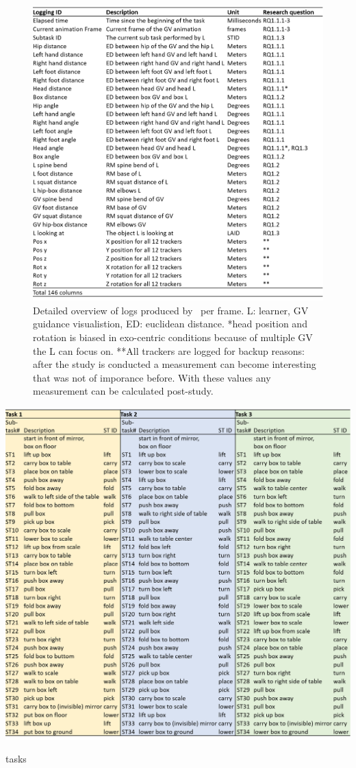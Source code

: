 \begin{figure}[htb]
	\centering
	\includegraphics[width=\textwidth]{figures/logging_detail.png}
	\caption[logging detail]{Detailed overview of logs produced by \exgo\ per frame. L: learner, GV guidance visualistion, ED: euclidean distance. *head position and rotation is biased in exo-centric conditions because of multiple GV the L can focus on. **All trackers are logged for backup reasons: after the study is conducted a measurement can become interesting that was not of imporance before. With these values any measurement can be calculated post-study.}
	\label{fig:logging_detail}
\end{figure}

\begin{table}[htb]
	\centering
	\includegraphics[width=\textwidth]{figures/tasks.png}
	\caption[Description of tasks]{tasks}
	\label{tab:tasks}
\end{table}

